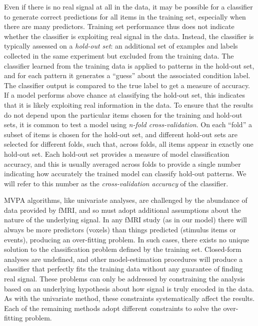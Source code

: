 Even if there is no real signal at all in the data, it may be possible for a classifier to generate correct predictions for all items in the training set, especially when there are many predictors. Training set performance thus does not indicate whether the classifier is exploiting real signal in the data. Instead, the classifier is typically assessed on a {\em hold-out set}: an additional set of examples and labels collected in the same experiment but excluded from the training data. The classifier learned from the training data is applied to patterns in the hold-out set, and for each pattern it generates a ``guess'' about the associated condition label. The classifier output is compared to the true label to get a measure of accuracy. If a model performs above chance at classifying the hold-out set, this indicates that it is likely exploiting real information in the data. To ensure that the results do not depend upon the particular items chosen for the training and hold-out sets, it is common to test a model using {\em n-fold cross-validation}. On each ``fold'' a subset of items is chosen for the hold-out set, and different hold-out sets are selected for different folds, such that, across folds, all items appear in exactly one hold-out set. Each hold-out set provides a measure of model classification accuracy, and this is usually averaged across folds to provide a single number indicating how accurately the trained model can classify hold-out patterns. We will refer to this number as the {\em cross-validation accuracy} of the classifier.

MVPA algorithms, like univariate analyses, are challenged by the abundance of data provided by fMRI, and so must adopt additional assumptions about the nature of the underlying signal. In any fMRI study (as in our model) there will always be more predictors (voxels) than things predicted (stimulus items or events), producing an over-fitting problem. In such cases, there exists no unique solution to the classification problem defined by the training set. Closed-form analyses are undefined, and other model-estimation procedures will produce a classifier that perfectly fits the training data without any guarantee of finding real signal. These problems can only be addressed by constraining the analysis based on an underlying hypothesis about how signal is truly encoded in the data. As with the univariate method, these constraints systematically affect the results. Each of the remaining methods adopt different constraints to solve the over-fitting problem.

